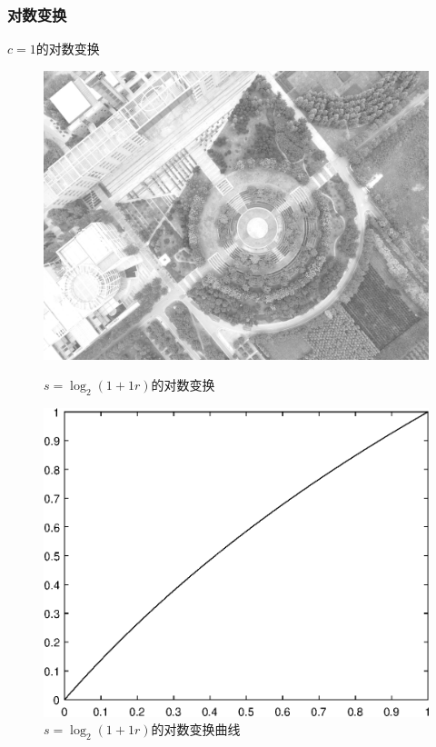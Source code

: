 \subsubsection{对数变换}
$c=1$的对数变换
\begin{figure}[H]
	\centering
	\begin{minipage}{0.45\linewidth}
		\includegraphics[width=\linewidth]{figure/DJI_0027_Log_100.png}
		\caption{$s=\log_2(1+1r)$的对数变换}
	\end{minipage}
	\begin{minipage}{0.45\linewidth}
		\includegraphics[width=\linewidth]{figure/DJI_0027_Log_100_Graph.eps}
		\caption{$s=\log_2(1+1r)$的对数变换曲线}
	\end{minipage}
\end{figure}

